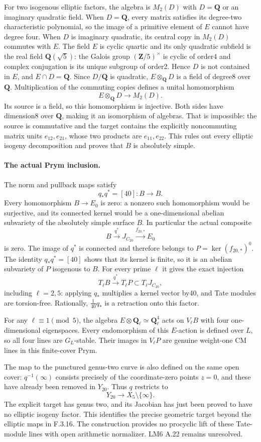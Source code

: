 For two isogenous elliptic factors, the algebra is $M_2(D)$ with
$D=\mathbf Q$ or an imaginary quadratic field. When $D=\mathbf Q$,
every matrix satisfies its degree-two characteristic polynomial, so
the image of a primitive element of $E$ cannot have degree four.
When $D$ is imaginary quadratic, its central copy in $M_2(D)$ commutes
with $E$. The field $E$ is cyclic quartic and its only quadratic
subfield is the real field $\mathbf Q(\sqrt5)$: the Galois group
$(\mathbf Z/5)^\times$ is cyclic of order4 and complex conjugation
is its unique subgroup of order2. Hence $D$ is not contained in $E$,
and $E\cap D=\mathbf Q$. Since $D/\mathbf Q$ is quadratic,
$E\otimes_{\mathbf Q}D$ is a field of degree8 over $\mathbf Q$.
Multiplication of the commuting copies defines a unital homomorphism
\[
 E\otimes_{\mathbf Q}D\longrightarrow M_2(D).
\]
Its source is a field, so this homomorphism is injective. Both sides
have dimension8 over $\mathbf Q$, making it an isomorphism of
algebras. That is impossible: the source is commutative and the
target contains the explicitly noncommuting matrix units
$e_{12},e_{21}$, whose two products are $e_{11},e_{22}$.
This rules out every elliptic isogeny decomposition and proves that
$B$ is absolutely simple.

\paragraph{The actual Prym inclusion.}
The norm and pullback maps satisfy
\[
 q_*q^*=[40]:B\to B.
\]
Every homomorphism $B\to E_0$ is zero: a nonzero such homomorphism
would be surjective, and its connected kernel would be a
one-dimensional abelian subvariety of the absolutely simple surface
$B$. In particular the actual composite
\[
 B\xrightarrow{q^*}J_{C_{20}}\xrightarrow{f_{20,*}}E_0
\]
is zero. The image of $q^*$ is connected and therefore belongs to
$P=\ker(f_{20,*})^0$. The identity $q_*q^*=[40]$ shows that its kernel
is finite, so it is an abelian subvariety of $P$ isogenous to $B$.
For every prime $\ell$ it gives the exact injection
\[
 T_\ell B\xrightarrow{q^*}T_\ell P\subset T_\ell J_{C_{20}},
\]
including $\ell=2,5$: applying $q_*$ multiplies a kernel vector by40,
and Tate modules are torsion-free. Rationally, $\tfrac1{40}q_*$ is a
retraction onto this factor.

For any $\ell\equiv1\pmod5$, the algebra
$E\otimes\mathbf Q_\ell\simeq\mathbf Q_\ell^4$ acts on
$V_\ell B$ with four one-dimensional eigenspaces. Every endomorphism
of this $E$-action is defined over $L$, so all four lines are
$G_L$-stable. Their images in $V_\ell P$ are genuine weight-one
CM lines in this finite-cover Prym.

The map to the punctured genus-two curve is also defined on the same
open cover: $q^{-1}(\infty)$ consists precisely of the coordinate-zero
points $z=0$, and these have already been removed in $Y_{20}$.
Thus $q$ restricts to
\[
 Y_{20}\longrightarrow X_5\setminus\{\infty\}.
\]
The explicit target has genus two, and its Jacobian has just been
proved to have no elliptic isogeny factor. This identifies the precise
geometric target beyond the elliptic maps in F.3.16. The construction
provides no procyclic lift of these Tate-module lines with open
arithmetic normalizer. LM6 A.22 remains unresolved.
